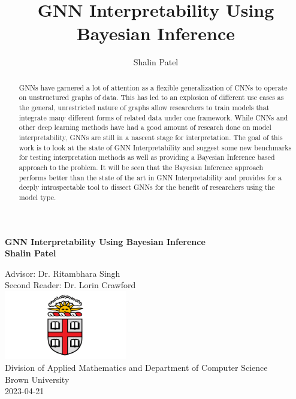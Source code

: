 \documentclass[11pt]{article}
\title{GNN Interpretability Using Bayesian Inference}
\author[1,2]{Shalin Patel}
\affil[1]{Division of Applied Mathematics, Brown University}
\affil[2]{Department of Computer Science, Brown University}
\begin{document}
\begin{titlepage}
\begin{center}
	\vspace*{1cm}
	{\Large{\textbf{GNN Interpretability Using Bayesian Inference}}} \\
	\vspace{0.5cm}
	\textbf{Shalin Patel}
	\vfill
    
    Advisor: Dr. Ritambhara Singh \\
	Second Reader: Dr. Lorin Crawford \\
	\vspace{0.8cm}
	\includegraphics[width=0.4\textwidth]{images/brown} \\
    \vspace{0.8cm}
	Division of Applied Mathematics and Department of Computer Science\\
	Brown University\\
	2023-04-21
\end{center}
\end{titlepage}

\tableofcontents
\newpage

\maketitle
\begin{abstract}
GNNs have garnered a lot of attention as a flexible generalization of CNNs to operate on unstructured graphs of data. This has led to an explosion of different use cases as the general, unrestricted nature of graphs allow researchers to train models that integrate many different forms of related data under one framework. While CNNs and other deep learning methods have had a good amount of research done on model interpretability, GNNs are still in a nascent stage for interpretation. The goal of this work is to look at the state of GNN Interpretability and suggest some new benchmarks for testing interpretation methods as well as providing a Bayesian Inference based approach to the problem. It will be seen that the Bayesian Inference approach performs better than the state of the art in GNN Interpretability and provides for a deeply introspectable tool to dissect GNNs for the benefit of researchers using the model type.
\end{abstract}









\small{}
\end{document}
